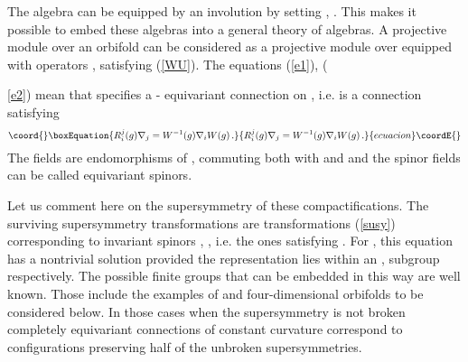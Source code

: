 \documentclass[a4paper,a4paper]{article}
\begin{document}
The algebra \coordHE{} can be equipped by an involution \myHighlight{$*$}\coordHE{} by setting 
\coordHE{}, \coordHE{}. This makes it possible to embed these algebras 
into a general theory of \coordHE{} algebras. 
A projective module over  an orbifold can be considered as a projective module \coordHE{}
over \coordHE{} equipped with operators \coordHE{}, \coordHE{} satisfying (\ref{WU}).
The equations (\ref{e1}), ({\ref{e2})  mean that \coordHE{} specifies
a \coordHE{}- equivariant connection  on \coordHE{}, i.e. \coordHE{} is  a \coordHE{} connection  satisfying 
\begin{equation}\coord{}\boxEquation{\label{eqcon}
R_{i}^{j}(g)\nabla_{j} = W^{-1}(g)\nabla_{i}W(g) \, .
}{R_{i}^{j}(g)\nabla_{j} = W^{-1}(g)\nabla_{i}W(g) \, .
}{ecuacion}\coordE{}\end{equation}
The fields \coordHE{} are endomorphisms of \coordHE{}, commuting both with \coordHE{} and \coordHE{} and the spinor fields 
 \myHighlight{$\psi_{\alpha}$}\coordHE{} can be called equivariant spinors.     


Let us comment here  on the supersymmetry of these compactifications. 
The surviving supersymmetry transformations are transformations (\ref{susy}) corresponding 
to invariant spinors \myHighlight{$\epsilon$}\coordHE{}, \myHighlight{$\tilde \epsilon$}\coordHE{}, i.e. the ones satisfying 
\coordHE{}. For \coordHE{}, \coordHE{}  this equation has a nontrivial solution 
provided the representation \coordHE{}  lies  within  an \coordHE{}, \coordHE{} subgroup respectively.
 The possible finite groups \coordHE{} that can 
be embedded in this way are well known. Those include the examples of \coordHE{} and 
\coordHE{} four-dimensional orbifolds to be considered below. In those cases when the 
supersymmetry is not broken completely  equivariant connections of constant curvature 
correspond to configurations preserving half of the unbroken supersymmetries.  



}
\end{document}

